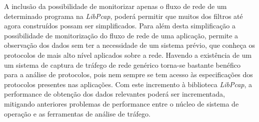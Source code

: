 A inclusão da possibilidade de monitorizar apenas o fluxo de rede de um determinado programa na \textit{LibPcap}, poderá permitir que muitos dos filtros até agora construídos possam ser simplificados.
Para além desta simplificação a possibilidade de monitorização do fluxo de rede de uma aplicação, permite a observação dos dados sem ter a necessidade de um sistema prévio, que conheça os protocolos de mais alto nível aplicados sobre a rede.
Havendo a existência de um um sistema de captura de tráfego de rede genérico torna-se bastante benéfico para a análise de protocolos, pois nem sempre se tem acesso às especificações dos protocolos presentes nas aplicações.
Com este incremento à biblioteca \textit{LibPcap}, a performance de obtenção dos dados relevantes poderá ser incrementada, mitigando anteriores problemas de performance entre o núcleo de sistema de operação e as ferramentas de análise de tráfego.

